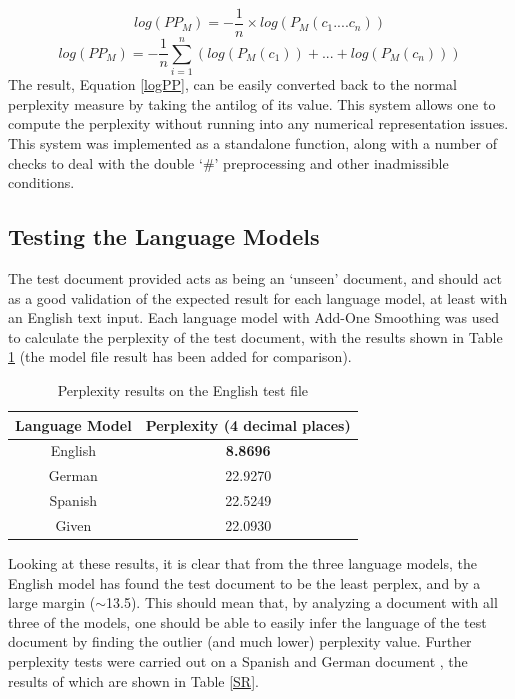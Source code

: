 \documentclass[12pt]{article}
\begin{document}
\[log\left(PP_{M}\right) = -\frac{1}{n}\times log\left(P_{M}\left( c_{1}.... c_{n}\right)\right)\]
\begin{equation}\label{logPP}
log\left(PP_{M}\right) = -\frac{1}{n} \sum_{i=1} ^{n}\left( log(P_{M}(c_{1})) + ... + log(P_{M}(c_{n})) \right)
\end{equation}
The result, Equation \ref{logPP}, can be easily converted back to the normal perplexity measure by taking the antilog of its value.  This system allows one to compute the perplexity without running into any numerical representation issues.  This system was implemented as a standalone function, along with a number of checks to deal with the double `\#' preprocessing and other inadmissible conditions.  
\subsection{Testing the Language Models}
The test document provided acts as being an `unseen' document, and should act as a good validation of the expected result for each language model, at least with an English text input.  Each language model with Add-One Smoothing was used to calculate the perplexity of the test document, with the results shown in Table \ref{TR} (the model file result has been added for comparison).
	\begin{table}[H]
	\centering
	\setlength\arrayrulewidth{1pt}
	\caption{\label{TR}Perplexity results on the English test file }
	\begin{tabular}{c  c }
		\hline
		\textbf{Language Model} & \textbf{Perplexity (4 decimal places)} \\
		\hline                     
	English& \textbf{8.8696}\\
	German & 22.9270 \\
	Spanish & 22.5249 \\
	Given & 22.0930\\
	\end{tabular}
\end{table}
Looking at these results, it is clear that from the three language models, the English model has found the test document to be the least perplex, and by a large margin ($\sim$13.5).  This should mean that, by analyzing a document with all three of the models, one should be able to easily infer the language of the test document by finding the outlier (and much lower) perplexity value.  Further perplexity tests were carried out on a Spanish \cite{FSpan} and German document \cite{GSpan}, the results of which are shown in Table \ref{SR}.
\end{document}
